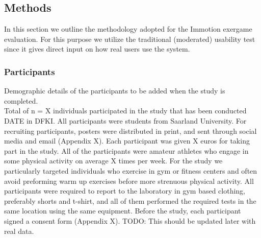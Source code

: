 \subsection{Methods} 
In this section we outline the methodology adopted for the Immotion exergame evaluation. For this purpose we utilize the traditional (moderated) usability test since it gives direct input on how real users use the system. %
%
\subsubsection{Participants}
Demographic details of the participants to be added when the study is completed.\\
Total of n = X individuals participated in the study that has been conducted DATE in DFKI. All participants were students from Saarland University. For recruiting participants, posters were distributed in print, and sent through social media and email (Appendix X). Each participant was given X euros for taking part in the study. All of the participants were amateur athletes who engage in some physical activity on average X times per week. For the study we particularly targeted individuals who exercise in gym or fitness centers and often avoid preforming warm up exercises before more strenuous physical activity. All participants were required to report to the laboratory in gym based clothing, preferably shorts and t-shirt, and all of them performed the required tests in the same location using the same equipment. Before the study, each participant signed a consent form (Appendix X). TODO: This should be updated later with real data.
